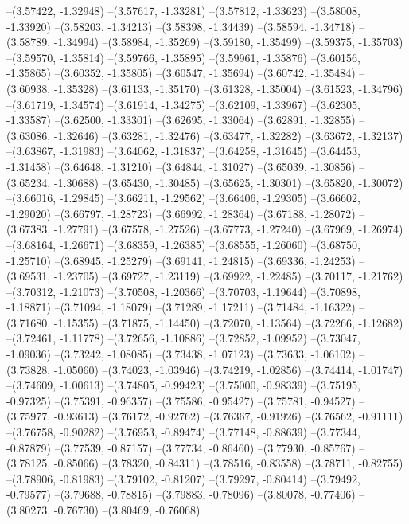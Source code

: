 --(3.57422, -1.32948)
--(3.57617, -1.33281)
--(3.57812, -1.33623)
--(3.58008, -1.33920)
--(3.58203, -1.34213)
--(3.58398, -1.34439)
--(3.58594, -1.34718)
--(3.58789, -1.34994)
--(3.58984, -1.35269)
--(3.59180, -1.35499)
--(3.59375, -1.35703)
--(3.59570, -1.35814)
--(3.59766, -1.35895)
--(3.59961, -1.35876)
--(3.60156, -1.35865)
--(3.60352, -1.35805)
--(3.60547, -1.35694)
--(3.60742, -1.35484)
--(3.60938, -1.35328)
--(3.61133, -1.35170)
--(3.61328, -1.35004)
--(3.61523, -1.34796)
--(3.61719, -1.34574)
--(3.61914, -1.34275)
--(3.62109, -1.33967)
--(3.62305, -1.33587)
--(3.62500, -1.33301)
--(3.62695, -1.33064)
--(3.62891, -1.32855)
--(3.63086, -1.32646)
--(3.63281, -1.32476)
--(3.63477, -1.32282)
--(3.63672, -1.32137)
--(3.63867, -1.31983)
--(3.64062, -1.31837)
--(3.64258, -1.31645)
--(3.64453, -1.31458)
--(3.64648, -1.31210)
--(3.64844, -1.31027)
--(3.65039, -1.30856)
--(3.65234, -1.30688)
--(3.65430, -1.30485)
--(3.65625, -1.30301)
--(3.65820, -1.30072)
--(3.66016, -1.29845)
--(3.66211, -1.29562)
--(3.66406, -1.29305)
--(3.66602, -1.29020)
--(3.66797, -1.28723)
--(3.66992, -1.28364)
--(3.67188, -1.28072)
--(3.67383, -1.27791)
--(3.67578, -1.27526)
--(3.67773, -1.27240)
--(3.67969, -1.26974)
--(3.68164, -1.26671)
--(3.68359, -1.26385)
--(3.68555, -1.26060)
--(3.68750, -1.25710)
--(3.68945, -1.25279)
--(3.69141, -1.24815)
--(3.69336, -1.24253)
--(3.69531, -1.23705)
--(3.69727, -1.23119)
--(3.69922, -1.22485)
--(3.70117, -1.21762)
--(3.70312, -1.21073)
--(3.70508, -1.20366)
--(3.70703, -1.19644)
--(3.70898, -1.18871)
--(3.71094, -1.18079)
--(3.71289, -1.17211)
--(3.71484, -1.16322)
--(3.71680, -1.15355)
--(3.71875, -1.14450)
--(3.72070, -1.13564)
--(3.72266, -1.12682)
--(3.72461, -1.11778)
--(3.72656, -1.10886)
--(3.72852, -1.09952)
--(3.73047, -1.09036)
--(3.73242, -1.08085)
--(3.73438, -1.07123)
--(3.73633, -1.06102)
--(3.73828, -1.05060)
--(3.74023, -1.03946)
--(3.74219, -1.02856)
--(3.74414, -1.01747)
--(3.74609, -1.00613)
--(3.74805, -0.99423)
--(3.75000, -0.98339)
--(3.75195, -0.97325)
--(3.75391, -0.96357)
--(3.75586, -0.95427)
--(3.75781, -0.94527)
--(3.75977, -0.93613)
--(3.76172, -0.92762)
--(3.76367, -0.91926)
--(3.76562, -0.91111)
--(3.76758, -0.90282)
--(3.76953, -0.89474)
--(3.77148, -0.88639)
--(3.77344, -0.87879)
--(3.77539, -0.87157)
--(3.77734, -0.86460)
--(3.77930, -0.85767)
--(3.78125, -0.85066)
--(3.78320, -0.84311)
--(3.78516, -0.83558)
--(3.78711, -0.82755)
--(3.78906, -0.81983)
--(3.79102, -0.81207)
--(3.79297, -0.80414)
--(3.79492, -0.79577)
--(3.79688, -0.78815)
--(3.79883, -0.78096)
--(3.80078, -0.77406)
--(3.80273, -0.76730)
--(3.80469, -0.76068)
